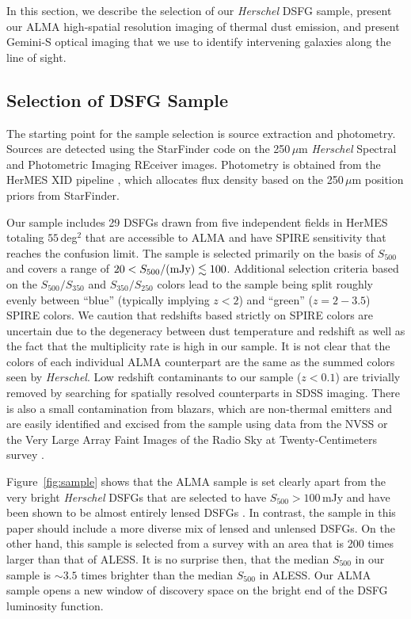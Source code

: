 \documentclass[iop]{emulateapj}
\begin{document}
In this section, we describe the selection of our {\it Herschel} DSFG sample,
present our ALMA high-spatial resolution imaging of thermal dust emission, and
present Gemini-S optical imaging that we use to identify intervening galaxies
along the line of sight.  

\subsection{Selection of DSFG Sample}\label{sec:select}

The starting point for the sample selection is source extraction and
photometry.  Sources are detected using the {\sc StarFinder} code
\citep{Diolaiti:2000qy} on the 250$\, \mu$m {\it Herschel} Spectral and
Photometric Imaging REceiver \citep[SPIRE;][]{2010A&A...518L...3G} images.
Photometry is obtained from the HerMES XID pipeline \citep{Roseboom:2010lk},
which allocates flux density based on the 250$\, \mu$m position priors from
{\sc StarFinder}.  

Our sample includes 29 DSFGs drawn from five independent fields in HerMES
totaling $55\,$deg$^2$ that are accessible to ALMA and have SPIRE sensitivity
that reaches the confusion limit.  The sample is selected primarily on the
basis of $S_{500}$ and covers a range of $20 < S_{500}/{\rm (mJy)} \lesssim
100$.  Additional selection criteria based on the $S_{500}/S_{350}$ and
$S_{350}/S_{250}$ colors lead to the sample being split roughly evenly between
``blue'' (typically implying $z < 2$) and ``green'' ($z = 2-3.5$) SPIRE colors.
We caution that redshifts based strictly on SPIRE colors are uncertain due to
the degeneracy between dust temperature and redshift as well as the fact that
the multiplicity rate is high in our sample.  It is not clear that the colors
of each individual ALMA counterpart are the same as the summed colors seen by
{\it Herschel}.  Low redshift contaminants to our sample ($z < 0.1$) are
trivially removed by searching for spatially resolved counterparts in SDSS
imaging.  There is also a small contamination from blazars, which are
non-thermal emitters and are easily identified and excised from the sample
using data from the NVSS or the Very Large Array Faint Images of the Radio Sky
at Twenty-Centimeters survey \citep[FIRST;][]{Becker:1995fj}.  

Figure~\ref{fig:sample} shows that the ALMA sample is set clearly apart from the
very bright {\it Herschel} DSFGs that are selected to have $S_{500} > 100 \,
$mJy and have been shown to be almost entirely lensed DSFGs
\citep{Negrello:2010fk, Wardlow:2013lr, Bussmann:2013lr}.  In contrast, the
sample in this paper should include a more diverse mix of lensed and unlensed
DSFGs.  On the other hand, this sample is selected from a survey with an area
that is 200 times larger than that of ALESS.  It is no surprise then, that the
median $S_{500}$ in our sample is $\sim3.5$ times brighter than the median
$S_{500}$ in ALESS.  Our ALMA sample opens a new window of discovery space on
the bright end of the DSFG luminosity function.
\end{document}

